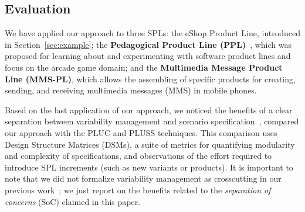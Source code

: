 \documentclass{report}
\begin{document}
\begin{frontmatter}
{%





\section{Evaluation}
\label{sec:evaluation}

We have applied our approach to three SPLs: the eShop Product Line, introduced in Section~\ref{sec:example}; the  
{\bf Pedagogical Product Line (PPL)}~\cite{ppl-url}, which was proposed for learning about and experimenting with software product lines and focus on the arcade game domain; and the 
{\bf Multimedia Message Product Line (MMS-PL)}, which allows the assembling of specific products for creating, sending, and receiving multimedia messages (MMS) in mobile phones.

Based on the last application of our approach, we noticed the benefits of a clear separation between variability management and scenario specification~\cite{rbonifacio-ea-2008}, compared our approach with the PLUC and PLUSS techniques. This comparison uses Design Structure Matrices (DSMs), a suite of metrics for quantifying modularity and complexity of specifications, and observations of the effort required to introduce SPL increments (such as new variants or products). It is important to note that we did not formalize variability management as crosscutting in our previous work~\cite{rbonifacio-ea-2008}; we just report on the benefits related to the \emph{separation of concerns} (SoC) claimed in this paper.

}
\end{frontmatter}
\end{document}
